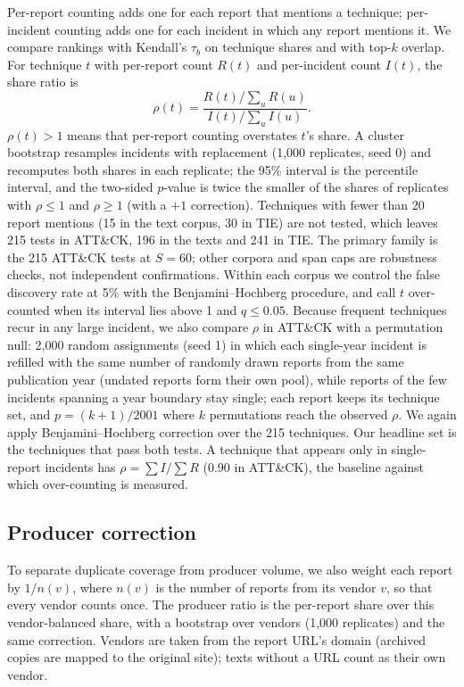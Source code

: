 \documentclass[runningheads]{llncs}
\newcommand{\attack}{ATT\&CK}
\begin{document}
Per-report counting adds one for each report that mentions a technique; per-incident counting adds one for each incident in which any report mentions it. We compare rankings with Kendall's $\tau_b$ on technique shares and with top-$k$ overlap. For technique $t$ with per-report count $R(t)$ and per-incident count $I(t)$, the share ratio is
\begin{equation}
\rho(t) = \frac{R(t) / \sum_u R(u)}{I(t) / \sum_u I(u)} .
\end{equation}
$\rho(t) > 1$ means that per-report counting overstates $t$'s share. A cluster bootstrap resamples incidents with replacement (1,000 replicates, seed 0) and recomputes both shares in each replicate; the 95\% interval is the percentile interval, and the two-sided $p$-value is twice the smaller of the shares of replicates with $\rho \leq 1$ and $\rho \geq 1$ (with a $+1$ correction). Techniques with fewer than 20 report mentions (15 in the text corpus, 30 in TIE) are not tested, which leaves 215 tests in \attack{}, 196 in the texts and 241 in TIE. The primary family is the 215 \attack{} tests at $S = 60$; other corpora and span caps are robustness checks, not independent confirmations. Within each corpus we control the false discovery rate at 5\% with the Benjamini--Hochberg procedure, and call $t$ over-counted when its interval lies above 1 and $q \leq 0.05$. Because frequent techniques recur in any large incident, we also compare $\rho$ in \attack{} with a permutation null: 2,000 random assignments (seed 1) in which each single-year incident is refilled with the same number of randomly drawn reports from the same publication year (undated reports form their own pool), while reports of the few incidents spanning a year boundary stay single; each report keeps its technique set, and $p = (k+1)/2001$ where $k$ permutations reach the observed $\rho$. We again apply Benjamini--Hochberg correction over the 215 techniques. Our headline set is the techniques that pass both tests. A technique that appears only in single-report incidents has $\rho = \sum I / \sum R$ (0.90 in \attack{}), the baseline against which over-counting is measured.

\subsection{Producer correction}

To separate duplicate coverage from producer volume, we also weight each report by $1/n(v)$, where $n(v)$ is the number of reports from its vendor $v$, so that every vendor counts once. The producer ratio is the per-report share over this vendor-balanced share, with a bootstrap over vendors (1,000 replicates) and the same correction. Vendors are taken from the report URL's domain (archived copies are mapped to the original site); texts without a URL count as their own vendor.
\end{document}
